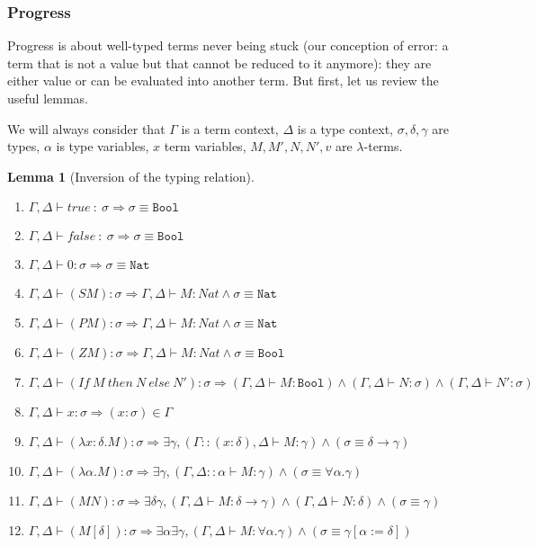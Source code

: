 \documentclass{article}
\newtheorem{lemma}[theorem]{Lemma}
\begin{document}
    \subsubsection{Progress}
    Progress is about well-typed terms never being stuck (our conception of error: a term that is not a value but that cannot be reduced to it anymore): they are either value or can be evaluated into another term. But first, let us review the useful lemmas. \par We will always consider that $\Gamma$ is a term context, $\Delta$ is a type context, $\sigma, \delta, \gamma $ are types, $\alpha$ is type variables, $x$ term variables, $M, M', N, N', v$ are $\lambda$-terms.
    \begin{lemma}[Inversion of the typing relation]
    \end{lemma}
    \label{inversion}\begin{enumerate}
        \item $\Gamma,\Delta \vdash true \ : \ \sigma \Rightarrow \sigma \equiv \texttt{Bool}$
        \item $\Gamma,\Delta \vdash false \ : \ \sigma \Rightarrow \sigma \equiv \texttt{Bool}$
        \item $\Gamma,\Delta \vdash 0 : \sigma \Rightarrow \sigma \equiv \texttt{Nat}$
        \item $\Gamma,\Delta \vdash (S M):\sigma \Rightarrow \Gamma,\Delta \vdash M:Nat \wedge \sigma \equiv \texttt{Nat}$
        \item $\Gamma,\Delta \vdash (P M):\sigma \Rightarrow \Gamma,\Delta \vdash M:Nat \wedge \sigma \equiv \texttt{Nat}$
        \item $\Gamma,\Delta \vdash (Z M):\sigma \Rightarrow \Gamma,\Delta \vdash M:Nat \wedge \sigma \equiv \texttt{Bool}$
        \item $\Gamma,\Delta \vdash (If \ M \ then \ N \ else \ N'):\sigma \Rightarrow (\Gamma,\Delta \vdash M:\texttt{Bool}) \wedge (\Gamma,\Delta \vdash N:\sigma) \wedge (\Gamma,\Delta \vdash N':\sigma)$
        \item $\Gamma,\Delta \vdash x:\sigma \Rightarrow (x : \sigma) \in \Gamma$
        \item $\Gamma,\Delta \vdash (\lambda x : \delta.M) :  \sigma \Rightarrow \exists \gamma, (\Gamma::(x : \delta),\Delta \vdash M : \gamma) \wedge (\sigma \equiv \delta \rightarrow \gamma)$
        \item $\Gamma,\Delta \vdash (\lambda \alpha.M):\sigma \Rightarrow \exists \gamma, (\Gamma,\Delta :: \alpha \vdash M:\gamma) \wedge (\sigma \equiv \forall \alpha. \gamma)$
        \item $\Gamma,\Delta \vdash (M N):\sigma \Rightarrow \exists \delta \gamma, (\Gamma,\Delta \vdash M : \delta \rightarrow \gamma) \wedge (\Gamma,\Delta \vdash N:\delta) \wedge (\sigma \equiv \gamma)$
        \item  $\Gamma,\Delta \vdash (M [\delta]):\sigma \Rightarrow \exists \alpha \exists \gamma, (\Gamma,\Delta \vdash M : \forall \alpha. \gamma) \wedge (\sigma \equiv \gamma[\alpha := \delta])$
    \end{enumerate}
\end{document}
